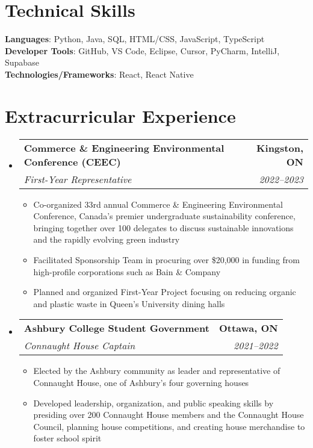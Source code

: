 \documentclass[letterpaper,10pt]{article}
\makeatletter
\newcommand{\resumeItem}[1]{
  \item\small{
    {#1 \vspace{-2pt}}
  }
}
\newcommand{\resumeSubheading}[4]{
  \vspace{-2pt}\item
    \begin{tabular*}{1.0\textwidth}[t]{l@{\extracolsep{\fill}}r}
      \textbf{#1} & \textbf{\small #2} \\
      \textit{\small#3} & \textit{\small #4} \\
    \end{tabular*}\vspace{-7pt}
}
\newcommand{\resumeSubHeadingListStart}{\begin{itemize}[leftmargin=0.0in, label={}]}
\newcommand{\resumeSubHeadingListEnd}{\end{itemize}}
\newcommand{\resumeItemListStart}{\begin{itemize}[label=--]}
\newcommand{\resumeItemListEnd}{\end{itemize}\vspace{-5pt}}
\makeatother
\begin{document}
%
\section{Technical Skills}
 \begin{itemize}[leftmargin=0.15in, label={}]
    \small{\item{
     \textbf{Languages}{: Python, Java, SQL, HTML/CSS, JavaScript, TypeScript} \\
     \textbf{Developer Tools}{: GitHub, VS Code, Eclipse, Cursor, PyCharm, IntelliJ, Supabase} \\
     \textbf{Technologies/Frameworks}{: React, React Native} \\
    }}
 \end{itemize}
 \vspace{-16pt}

\section{Extracurricular Experience}
    \resumeSubHeadingListStart
      \resumeSubheading
        {Commerce \& Engineering Environmental Conference (CEEC)}{Kingston, ON}
        {First-Year Representative}{2022--2023}
        \resumeItemListStart
            \resumeItem{Co-organized 33rd annual Commerce \& Engineering Environmental Conference, Canada's premier undergraduate sustainability conference, bringing together over 100 delegates to discuss sustainable innovations and the rapidly evolving green industry}
            \resumeItem{Facilitated Sponsorship Team in procuring over \$20,000 in funding from high-profile corporations such as Bain \& Company}
            \resumeItem{Planned and organized First-Year Project focusing on reducing organic and plastic waste in Queen's University dining halls}
        \resumeItemListEnd
      \resumeSubheading
        {Ashbury College Student Government}{Ottawa, ON}
        {Connaught House Captain}{2021--2022}
        \resumeItemListStart
            \resumeItem{Elected by the Ashbury community as leader and representative of Connaught House, one of Ashbury's four governing houses}
            \resumeItem{Developed leadership, organization, and public speaking skills by presiding over 200 Connaught House members and the Connaught House Council, planning house competitions, and creating house merchandise to foster school spirit}
        \resumeItemListEnd
    \resumeSubHeadingListEnd

\end{document}
